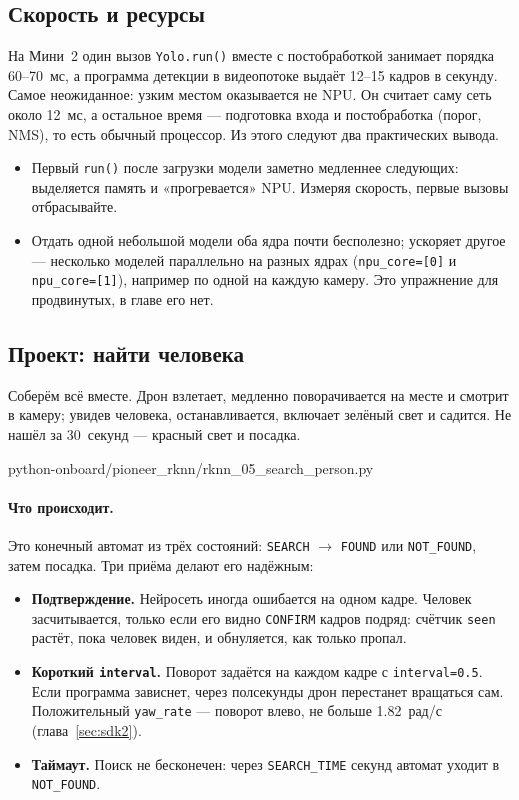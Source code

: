 \subsection{Скорость и ресурсы}\label{sec:rknn-speed}

На Мини~2 один вызов \verb|Yolo.run()| вместе с постобработкой занимает порядка 60--70~мс, а программа детекции в видеопотоке выдаёт 12--15 кадров в секунду. Самое неожиданное: узким местом оказывается не NPU. Он считает саму сеть около 12~мс, а остальное время --- подготовка входа и постобработка (порог, NMS), то есть обычный процессор. Из этого следуют два практических вывода.

\begin{itemize}
    \item Первый \verb|run()| после загрузки модели заметно медленнее следующих: выделяется память и «прогревается» NPU. Измеряя скорость, первые вызовы отбрасывайте.
    \item Отдать одной небольшой модели оба ядра почти бесполезно; ускоряет другое --- несколько моделей параллельно на разных ядрах (\verb|npu_core=[0]| и \verb|npu_core=[1]|), например по одной на каждую камеру. Это упражнение для продвинутых, в главе его нет.
\end{itemize}

\subsection{Проект: найти человека}

Соберём всё вместе. Дрон взлетает, медленно поворачивается на месте и смотрит в камеру; увидев человека, останавливается, включает зелёный свет и садится. Не нашёл за 30~секунд --- красный свет и посадка.

\begin{codefile}[python]{python-onboard/pioneer_rknn/rknn_05_search_person.py}
\end{codefile}

\paragraph{Что происходит.} Это конечный автомат из трёх состояний: \verb|SEARCH| $\to$ \verb|FOUND| или \verb|NOT_FOUND|, затем посадка. Три приёма делают его надёжным:
\begin{itemize}
    \item \textbf{Подтверждение.} Нейросеть иногда ошибается на одном кадре. Человек засчитывается, только если его видно \verb|CONFIRM| кадров подряд: счётчик \verb|seen| растёт, пока человек виден, и обнуляется, как только пропал.
    \item \textbf{Короткий \texttt{interval}.} Поворот задаётся на каждом кадре с \verb|interval=0.5|. Если программа зависнет, через полсекунды дрон перестанет вращаться сам. Положительный \verb|yaw_rate| --- поворот влево, не больше 1.82~рад/с (глава~\ref{sec:sdk2}).
    \item \textbf{Таймаут.} Поиск не бесконечен: через \verb|SEARCH_TIME| секунд автомат уходит в \verb|NOT_FOUND|.
\end{itemize}

